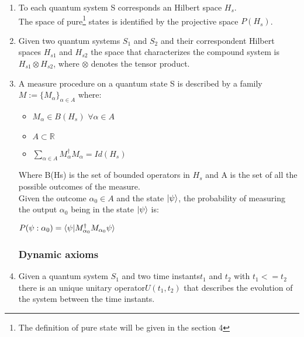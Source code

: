 \documentclass{article}
\begin{document}
\begin{enumerate}
    \item To each quantum system S corresponds an Hilbert space $H_s$.\\
      The space of pure\footnote{The definition of pure state will
      be given in the section 4}
      states is identified by the projective space $P(H_s)$.

  \item Given two quantum systems $S_1$ and $S_2$ and their correspondent
    Hilbert spaces $H_{s1}$ and $H_{s2}$ the space that characterizes the
    compound system is $H_{s1} \otimes H_{s2}$, where $\otimes$ denotes
    the tensor product.

  \item A measure procedure on a quantum state S is described
    by a family \\  $M := \{M_\alpha \}_{\alpha\in A}$ where:

    \begin{itemize}
        \item $M_\alpha \in B(H_s) $ $ \forall \alpha \in A$
        \item $A \subset \mathbb{R}$
        \item $\sum_{\alpha \in A} M_\alpha^\dag M_\alpha = Id(H_s)$
    \end{itemize}

    Where B(Hs) is the set of bounded operators in $H_s$ and A is the
    set of all the possible outcomes of the measure.\\
    Given the outcome $\alpha_0 \in A$ and the state $\ket{\psi}$,
    the probability
    of measuring the output $\alpha_0$ being in the state $\ket{\psi}$
    is: 
    \begin{center}
      $P(\psi : \alpha_0) = \braket{\psi|M_{\alpha_0}^\dag M_{\alpha_0}\psi}$
      
    \end{center}

    
\subsubsection{Dynamic axioms}


\item Given a quantum system $S_1$ and two time instants$ t_1$ and $t_2$
  with $t_1<=t_2$ there is an unique unitary operator$U(t_1,t_2)$ that
  describes the evolution of the system between the time instants.


\end{enumerate}
\end{document}

